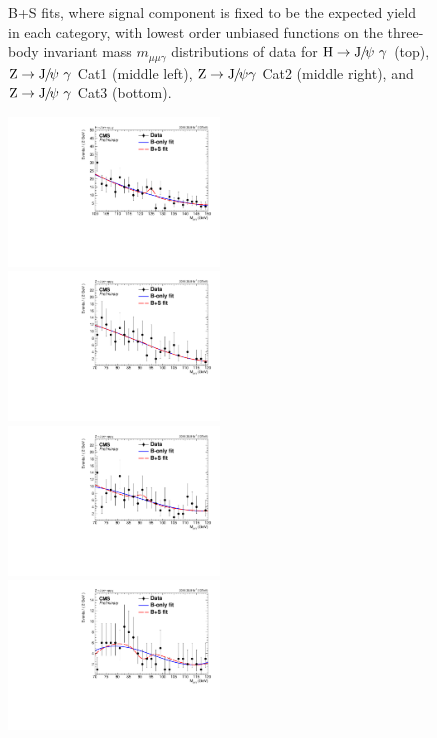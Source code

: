 \begin{figure}[p]
		    \caption[]{\label{fig:sbfitfix}
		     B+S fits, where signal component is fixed to be the expected yield in each category, with lowest order unbiased functions on the three-body invariant mass $m_{\mu\mu\gamma}$ distributions of data for $\PH\to \JPsi\ \gamma$ (top), $\cPZ\to \JPsi\ \gamma$ Cat1 (middle left), $\mathrm{Z}\to {\mathrm{J}\hspace{-.08em}/\hspace{-.14em}\psi}\gamma$ Cat2 (middle right), and $\cPZ\to \JPsi\ \gamma$ Cat3 (bottom).}
		\end{figure}
		
		\begin{figure}[p]
		    \centering
		    \includegraphics[width=0.5\textwidth]{Fig/Fit/SBFit_notfix/BkgSigFit_HJpsiG_Inclusive_Bernstein2}\\
		    \includegraphics[width=0.5\textwidth]{Fig/Fit/SBFit_notfix/BkgSigFit_ZJpsiG_EBHR9_Bernstein3}~
		    \includegraphics[width=0.5\textwidth]{Fig/Fit/SBFit_notfix/BkgSigFit_ZJpsiG_EBLR9_Bernstein3}\\
		    \includegraphics[width=0.5\textwidth]{Fig/Fit/SBFit_notfix/BkgSigFit_ZJpsiG_EE_Bernstein3}\\

\end{figure}
